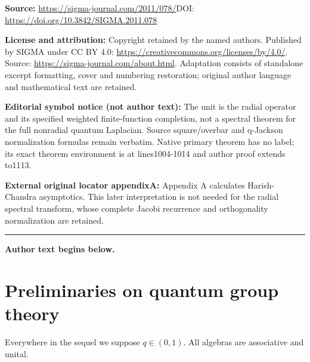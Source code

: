 \documentclass[11pt]{article}
\begin{document}
\noindent\textbf{Source:} \url{https://sigma-journal.com/2011/078/}\quad DOI: \url{https://doi.org/10.3842/SIGMA.2011.078}\par
\noindent\textbf{License and attribution:} Copyright retained by the named authors. Published by SIGMA under CC BY 4.0: \url{https://creativecommons.org/licenses/by/4.0/}. Source: \url{https://sigma-journal.com/about.html}. Adaptation consists of standalone excerpt formatting, cover and numbering restoration; original author language and mathematical text are retained.\par
\noindent\textbf{Editorial symbol notice (not author text):} The unit is the radial operator and its specified weighted finite-function completion, not a spectral theorem for the full nonradial quantum Laplacian. Source square/overbar and q-Jackson normalization formulas remain verbatim. Native primary theorem has no label; its exact theorem environment is at lines1004-1014 and author proof extends to1113.\par
\noindent\textbf{External original locator appendixA:} Appendix A calculates Harish-Chandra asymptotics. This later interpretation is not needed for the radial spectral transform, whose complete Jacobi recurrence and orthogonality normalization are retained.\par
\medskip\hrule\medskip\noindent\textbf{Author text begins below.}\par
\setcounter{section}{1}
\setcounter{subsection}{0}
\setcounter{subsubsection}{0}
\setcounter{equation}{0}
\section{Preliminaries on quantum group theory}\label{sec_1}

Everywhere in the sequel we suppose $q\in(0,1)$. All algebras are associative and unital.
\end{document}
